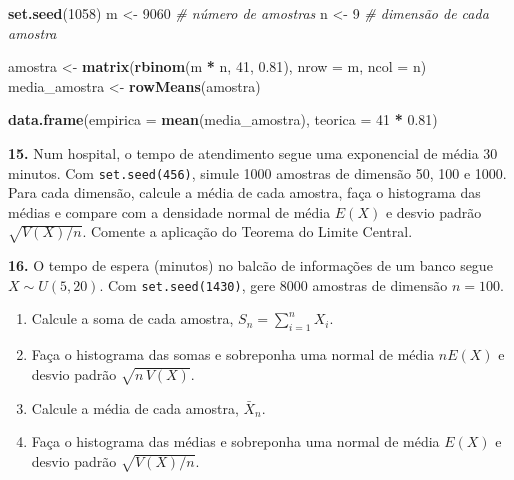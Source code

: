 \documentclass[
  portuguese,
  11pt,
  openany]{book}
\newenvironment{Shaded}{\begin{snugshade}}{\end{snugshade}}
\newcommand{\AttributeTok}[1]{\textcolor[rgb]{0.13,0.29,0.53}{#1}}
\newcommand{\CommentTok}[1]{\textcolor[rgb]{0.56,0.35,0.01}{\textit{#1}}}
\newcommand{\DecValTok}[1]{\textcolor[rgb]{0.00,0.00,0.81}{#1}}
\newcommand{\FloatTok}[1]{\textcolor[rgb]{0.00,0.00,0.81}{#1}}
\newcommand{\FunctionTok}[1]{\textcolor[rgb]{0.13,0.29,0.53}{\textbf{#1}}}
\newcommand{\NormalTok}[1]{#1}
\newcommand{\OtherTok}[1]{\textcolor[rgb]{0.56,0.35,0.01}{#1}}
\newcommand{\SpecialCharTok}[1]{\textcolor[rgb]{0.81,0.36,0.00}{\textbf{#1}}}
\providecommand{\tightlist}{%
  \setlength{\itemsep}{0pt}\setlength{\parskip}{0pt}}
\begin{document}
\begin{Shaded}
\begin{Highlighting}[]
\FunctionTok{set.seed}\NormalTok{(}\DecValTok{1058}\NormalTok{)}
\NormalTok{m }\OtherTok{\textless{}{-}} \DecValTok{9060}      \CommentTok{\# número de amostras}
\NormalTok{n }\OtherTok{\textless{}{-}} \DecValTok{9}         \CommentTok{\# dimensão de cada amostra}

\NormalTok{amostra }\OtherTok{\textless{}{-}} \FunctionTok{matrix}\NormalTok{(}\FunctionTok{rbinom}\NormalTok{(m }\SpecialCharTok{*}\NormalTok{ n, }\DecValTok{41}\NormalTok{, }\FloatTok{0.81}\NormalTok{), }\AttributeTok{nrow =}\NormalTok{ m, }\AttributeTok{ncol =}\NormalTok{ n)}
\NormalTok{media\_amostra }\OtherTok{\textless{}{-}} \FunctionTok{rowMeans}\NormalTok{(amostra)}

\FunctionTok{data.frame}\NormalTok{(}\AttributeTok{empirica =} \FunctionTok{mean}\NormalTok{(media\_amostra), }\AttributeTok{teorica =} \DecValTok{41} \SpecialCharTok{*} \FloatTok{0.81}\NormalTok{)}
\end{Highlighting}
\end{Shaded}

\textbf{15.} Num hospital, o tempo de atendimento segue uma exponencial de média 30 minutos.
Com \texttt{set.seed(456)}, simule 1000 amostras de dimensão 50, 100 e 1000. Para cada
dimensão, calcule a média de cada amostra, faça o histograma das médias e compare com a
densidade normal de média \(E(X)\) e desvio padrão \(\sqrt{V(X)/n}\). Comente a aplicação do
Teorema do Limite Central.

\textbf{16.} O tempo de espera (minutos) no balcão de informações de um banco segue
\(X \sim U(5, 20)\). Com \texttt{set.seed(1430)}, gere 8000 amostras de dimensão \(n = 100\).

\begin{enumerate}
\def\labelenumi{(\alph{enumi})}
\tightlist
\item
  Calcule a soma de cada amostra, \(S_n = \sum_{i=1}^n X_i\).
\item
  Faça o histograma das somas e sobreponha uma normal de média \(nE(X)\) e desvio padrão
  \(\sqrt{n\,V(X)}\).
\item
  Calcule a média de cada amostra, \(\bar{X}_n\).
\item
  Faça o histograma das médias e sobreponha uma normal de média \(E(X)\) e desvio padrão
  \(\sqrt{V(X)/n}\).
\end{enumerate}
\end{document}
